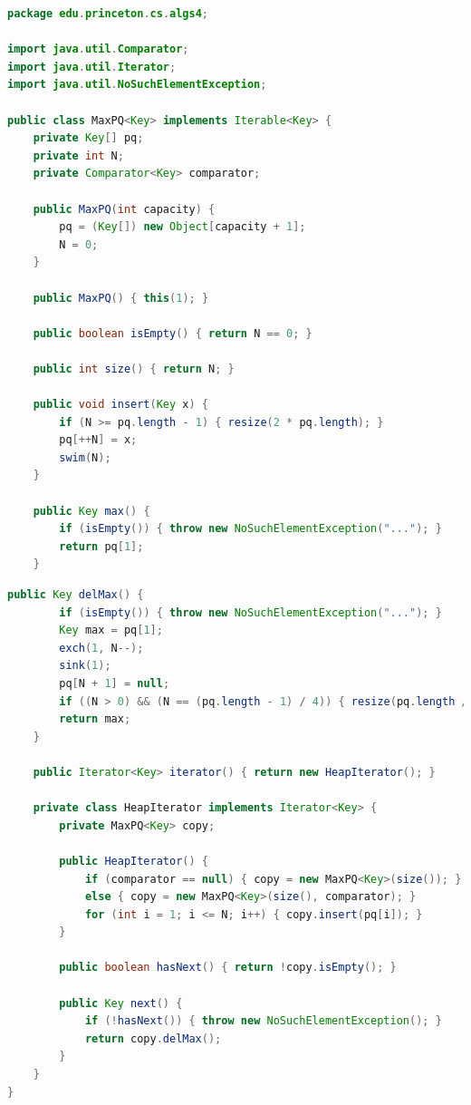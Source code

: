 \documentclass[8pt,a4paper,compress]{beamer}
\begin{document}
\begin{frame}[fragile]
\pause

\begin{lstlisting}[language=Java]
package edu.princeton.cs.algs4;

import java.util.Comparator;
import java.util.Iterator;
import java.util.NoSuchElementException;

public class MaxPQ<Key> implements Iterable<Key> {
    private Key[] pq;
    private int N;
    private Comparator<Key> comparator; 
    
    public MaxPQ(int capacity) {
        pq = (Key[]) new Object[capacity + 1];
        N = 0;
    }

    public MaxPQ() { this(1); }
    
    public boolean isEmpty() { return N == 0; }

    public int size() { return N; }

    public void insert(Key x) {
        if (N >= pq.length - 1) { resize(2 * pq.length); }
        pq[++N] = x;
        swim(N);
    }

    public Key max() {
        if (isEmpty()) { throw new NoSuchElementException("..."); }
        return pq[1];
    }
\end{lstlisting}
\end{frame}

\begin{frame}[fragile]
\pause

\begin{lstlisting}[language=Java]    
    public Key delMax() {
        if (isEmpty()) { throw new NoSuchElementException("..."); }
        Key max = pq[1];
        exch(1, N--);
        sink(1);
        pq[N + 1] = null; 
        if ((N > 0) && (N == (pq.length - 1) / 4)) { resize(pq.length / 2); }
        return max;
    }
    
    public Iterator<Key> iterator() { return new HeapIterator(); }
    
    private class HeapIterator implements Iterator<Key> {
        private MaxPQ<Key> copy;

        public HeapIterator() {
            if (comparator == null) { copy = new MaxPQ<Key>(size()); }
            else { copy = new MaxPQ<Key>(size(), comparator); }
            for (int i = 1; i <= N; i++) { copy.insert(pq[i]); }
        }

        public boolean hasNext() { return !copy.isEmpty(); }

        public Key next() {
            if (!hasNext()) { throw new NoSuchElementException(); }
            return copy.delMax();
        }
    }
}
\end{lstlisting}
\end{frame}
\end{document}
